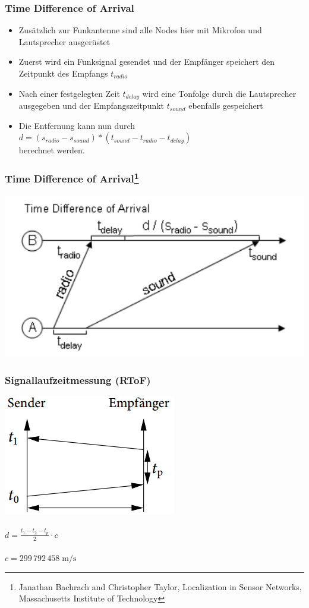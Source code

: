 \begin{frame}
\frametitle{Time Difference of Arrival}
\begin{itemize}
  \item Zusätzlich zur Funkantenne sind alle Nodes hier mit Mikrofon und Lautsprecher ausgerüstet
  \item Zuerst wird ein Funksignal gesendet und der Empfänger speichert den Zeitpunkt des Empfangs $t_{radio}$
  \item Nach einer festgelegten Zeit $t_{delay}$ wird eine Tonfolge durch die Lautsprecher ausgegeben und der Empfangszeitpunkt $t_{sound}$ ebenfalls gespeichert
  \item Die Entfernung kann nun durch $d = (s_{radio} - s_{sound}) * (t_{sound} - t_{radio} - t_{delay})$ \\berechnet werden.
\end{itemize}
\end{frame}

\begin{frame}
\frametitle{Time Difference of Arrival\footnote{Janathan Bachrach and Christopher Taylor, Localization in Sensor Networks, Massachusetts Institute of Technology}}
  \begin{center}
    \includegraphics[scale=0.5]{img/tdoa1.png}
  \end{center}
\end{frame}

\begin{frame}
  \frametitle{Signallaufzeitmessung (RToF)}

  \begin{center}
    \includegraphics[scale=0.35]{img/time3}\\~\\

    $d = \frac{t_{1} - t_{2} - t_{p}}{2} \cdot c$\\~\\
    $c=299\,792\,458\;\mathrm{m/s}$
  \end{center}
\end{frame}

